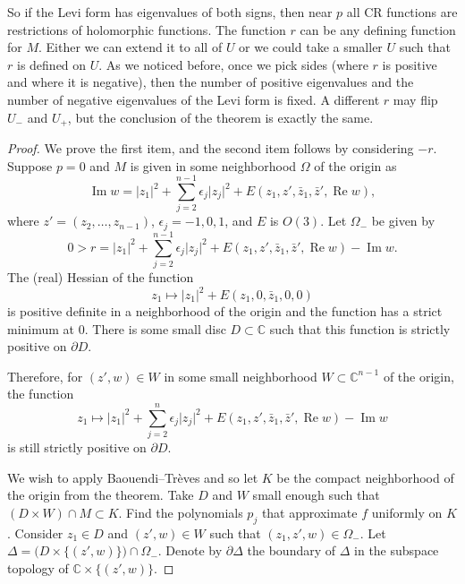 \documentclass[12pt,openany]{book}
\renewcommand{\Re}{\operatorname{Re}}
\renewcommand{\Im}{\operatorname{Im}}
\newcommand{\sabs}[1]{\lvert {#1} \rvert}
\newcommand{\C}{{\mathbb{C}}}
\theoremstyle{plain}
\theoremstyle{remark}
\theoremstyle{definition}
\theoremstyle{exercise}
\theoremstyle{example}
\begin{document}
So if the Levi form has eigenvalues of both signs,
then near $p$ all CR functions are restrictions of holomorphic
functions.
The function $r$ can be any defining
function for $M$.  Either we can extend it to all of $U$ or we could take a
smaller $U$ such that $r$ is defined on $U$.  As we noticed before,
once we pick sides (where $r$ is positive and where it is negative), then
the number of positive eigenvalues and the number of negative eigenvalues of
the Levi form is fixed.  A different $r$ may flip $U_-$
and $U_+$, but the conclusion of the theorem is exactly the same.

\begin{proof}
We prove the first item, and the second item follows by considering $-r$.
Suppose $p = 0$ and $M$ is given in some neighborhood
$\Omega$ of the origin as
\begin{equation*}
\Im w = \sabs{z_1}^2 + \sum_{j=2}^{n-1} \epsilon_j \sabs{z_j}^2 +
E(z_1,z',\bar{z}_1,\bar{z}',\Re w) ,
\end{equation*}
where $z' = (z_2,\ldots,z_{n-1})$, $\epsilon_j = -1,0,1$,
and $E$ is $O(3)$.
Let $\Omega_-$ be given by
\begin{equation*}
0 > r = \sabs{z_1}^2 + \sum_{j=2}^{n-1} \epsilon_j \sabs{z_j}^2 +
E(z_1,z',\bar{z}_1,\bar{z}',\Re w) - \Im w .
\end{equation*}
The (real) Hessian of the function
\begin{equation*}
z_1 \mapsto \sabs{z_1}^2 +
E(z_1,0,\bar{z}_1,0,0) 
\end{equation*}
is positive definite in a 
neighborhood of the origin and the function has a strict minimum at 0.
There is some small disc $D \subset \C$ such
that this function is strictly positive on $\partial D$.

Therefore,
for $(z',w) \in W$ in some small neighborhood $W \subset \C^{n-1}$ of the origin, the 
function
\begin{equation*}
z_1 \mapsto \sabs{z_1}^2 + \sum_{j=2}^n \epsilon_j \sabs{z_j}^2 +
E(z_1,z',\bar{z}_1,\bar{z}',\Re w) - \Im w
\end{equation*}
is still strictly positive on $\partial D$.

We wish to apply
Baouendi--Tr{\`e}ves and so let $K$ be the compact neighborhood of the
origin from the theorem.  Take $D$ and $W$ small enough such
that $(D \times W) \cap M \subset K$.
Find the polynomials $p_j$ that approximate $f$ uniformly on $K$.
Consider $z_1 \in D$ and $(z',w) \in W$ such that
$(z_1,z',w) \in \Omega_-$.
Let
$\Delta = \bigl( D \times \{ (z',w) \} \bigr) \cap \Omega_-$.
Denote by $\partial \Delta$ the boundary of $\Delta$ in the subspace topology
of $\C \times \{ (z',w) \}$.


\end{proof}
\end{document}
